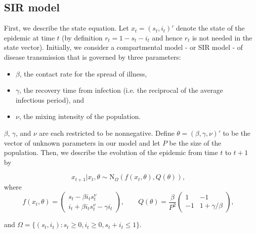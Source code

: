 \subsection{SIR model \label{sec:epid:state}}

First, we describe the state equation. Let $x_t = (s_t,i_t)'$ denote the state of the epidemic at time $t$ (by definition $r_t=1-s_t-i_t$ and hence $r_t$ is not needed in the state vector). Initially, we consider a compartmental model - or SIR model - of disease transmission that is governed by three parameters:

\begin{itemize}
\item $\beta$, the contact rate for the spread of illness,
\item $\gamma$, the recovery time from infection (i.e. the reciprocal of the average infectious period), and
\item $\nu$, the mixing intensity of the population.
\end{itemize}

\noindent $\beta$, $\gamma$, and $\nu$ are each restricted to be nonnegative. Define $\theta = (\beta,\gamma,\nu)'$ to be the vector of unknown parameters in our model and let $P$ be the size of the population. Then, we describe the evolution of the epidemic from time $t$ to $t + 1$ by

\begin{equation}
x_{t+1}\left|x_t,\theta\right. \sim \mbox{N}_\Omega\left(f(x_t,\theta),Q(\theta)\right), \label{eqn:epid:state}
\end{equation}
\noindent where
\[
f(x_t,\theta) = \left(
\begin{array}{c}
s_t - \beta i_ts^\nu_t \phantom{- \gamma i_t}\,\, \\
i_t +  \beta i_ts^\nu_t - \gamma i_t
\end{array}
\right),
\qquad
Q(\theta) = \frac{\beta}{P^2} \left(
\begin{array}{ccccc}
1 & -1 \\
-1 & 1 + \gamma/\beta
\end{array}
\right),
\]

\noindent and $\Omega = \{(s_t,i_t): s_t \ge 0, i_t \ge 0, s_t + i_t \le 1\}$.

